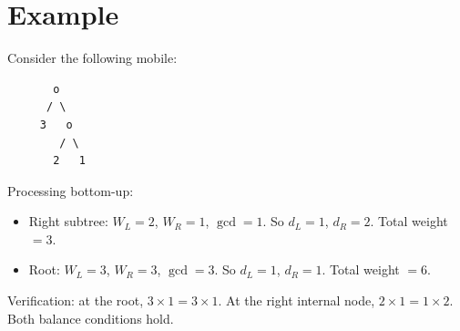 \documentclass[11pt,a4paper]{article}
\begin{document}
\section{Example}

Consider the following mobile:
\begin{verbatim}
       o
      / \
     3   o
        / \
       2   1
\end{verbatim}

Processing bottom-up:
\begin{itemize}
  \item Right subtree: $W_L = 2$, $W_R = 1$, $\gcd = 1$.
    So $d_L = 1$, $d_R = 2$. Total weight $= 3$.
  \item Root: $W_L = 3$, $W_R = 3$, $\gcd = 3$.
    So $d_L = 1$, $d_R = 1$. Total weight $= 6$.
\end{itemize}

Verification: at the root, $3 \times 1 = 3 \times 1$. At the right internal
node, $2 \times 1 = 1 \times 2$. Both balance conditions hold.
\end{document}
